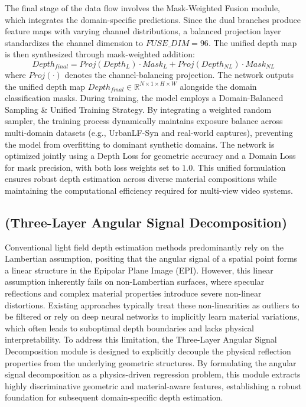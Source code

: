 The final stage of the data flow involves the Mask-Weighted Fusion module, which integrates the domain-specific predictions. Since the dual branches produce feature maps with varying channel distributions, a balanced projection layer standardizes the channel dimension to $FUSE\_DIM=96$. The unified depth map is then synthesized through mask-weighted addition:
\begin{equation}
\label{eq:eq3}
Depth_{final} = Proj(Depth_L) \cdot Mask_L + Proj(Depth_{NL}) \cdot Mask_{NL}
\end{equation}
where $Proj(\cdot)$ denotes the channel-balancing projection. The network outputs the unified depth map $Depth_{final} \in \mathbb{R}^{N \times 1 \times H \times W}$ alongside the domain classification masks. During training, the model employs a Domain-Balanced Sampling \& Unified Training Strategy. By integrating a weighted random sampler, the training process dynamically maintains exposure balance across multi-domain datasets (e.g., UrbanLF-Syn and real-world captures), preventing the model from overfitting to dominant synthetic domains. The network is optimized jointly using a Depth Loss for geometric accuracy and a Domain Loss for mask precision, with both loss weights set to $1.0$. This unified formulation ensures robust depth estimation across diverse material compositions while maintaining the computational efficiency required for multi-view video systems.

\subsection{(Three-Layer Angular Signal Decomposition)}

Conventional light field depth estimation methods predominantly rely on the Lambertian assumption, positing that the angular signal of a spatial point forms a linear structure in the Epipolar Plane Image (EPI). However, this linear assumption inherently fails on non-Lambertian surfaces, where specular reflections and complex material properties introduce severe non-linear distortions. Existing approaches typically treat these non-linearities as outliers to be filtered or rely on deep neural networks to implicitly learn material variations, which often leads to suboptimal depth boundaries and lacks physical interpretability. To address this limitation, the Three-Layer Angular Signal Decomposition module is designed to explicitly decouple the physical reflection properties from the underlying geometric structures. By formulating the angular signal decomposition as a physics-driven regression problem, this module extracts highly discriminative geometric and material-aware features, establishing a robust foundation for subsequent domain-specific depth estimation.


